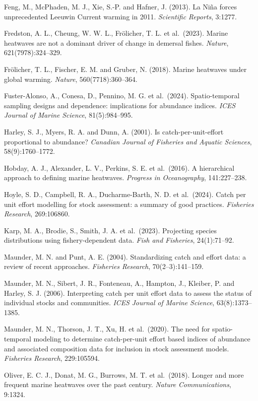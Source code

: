 \documentclass[
  11pt,
  a4paper,
]{article}
\newenvironment{hangparas}{\setlength{\parindent}{-1.5em}\setlength{\leftskip}{1.5em}\setlength{\parskip}{4pt}}{\par}
\begin{document}
\begin{hangparas}
Feng, M., McPhaden, M. J., Xie, S.-P. and Hafner, J. (2013). La Niña
forces unprecedented Leeuwin Current warming in 2011. \emph{Scientific
Reports}, 3:1277.

Fredston, A. L., Cheung, W. W. L., Frölicher, T. L. et al.~(2023).
Marine heatwaves are not a dominant driver of change in demersal fishes.
\emph{Nature}, 621(7978):324--329.

Frölicher, T. L., Fischer, E. M. and Gruber, N. (2018). Marine heatwaves
under global warming. \emph{Nature}, 560(7718):360--364.

Fuster-Alonso, A., Conesa, D., Pennino, M. G. et al.~(2024).
Spatio-temporal sampling designs and dependence: implications for
abundance indices. \emph{ICES Journal of Marine Science},
81(5):984--995.

Harley, S. J., Myers, R. A. and Dunn, A. (2001). Is
catch-per-unit-effort proportional to abundance? \emph{Canadian Journal
of Fisheries and Aquatic Sciences}, 58(9):1760--1772.

Hobday, A. J., Alexander, L. V., Perkins, S. E. et al.~(2016). A
hierarchical approach to defining marine heatwaves. \emph{Progress in
Oceanography}, 141:227--238.

Hoyle, S. D., Campbell, R. A., Ducharme-Barth, N. D. et al.~(2024).
Catch per unit effort modelling for stock assessment: a summary of good
practices. \emph{Fisheries Research}, 269:106860.

Karp, M. A., Brodie, S., Smith, J. A. et al.~(2023). Projecting species
distributions using fishery-dependent data. \emph{Fish and Fisheries},
24(1):71--92.

Maunder, M. N. and Punt, A. E. (2004). Standardizing catch and effort
data: a review of recent approaches. \emph{Fisheries Research},
70(2--3):141--159.

Maunder, M. N., Sibert, J. R., Fonteneau, A., Hampton, J., Kleiber, P.
and Harley, S. J. (2006). Interpreting catch per unit effort data to
assess the status of individual stocks and communities. \emph{ICES
Journal of Marine Science}, 63(8):1373--1385.

Maunder, M. N., Thorson, J. T., Xu, H. et al.~(2020). The need for
spatio-temporal modeling to determine catch-per-unit effort based
indices of abundance and associated composition data for inclusion in
stock assessment models. \emph{Fisheries Research}, 229:105594.

Oliver, E. C. J., Donat, M. G., Burrows, M. T. et al.~(2018). Longer and
more frequent marine heatwaves over the past century. \emph{Nature
Communications}, 9:1324.


\end{hangparas}
\end{document}
